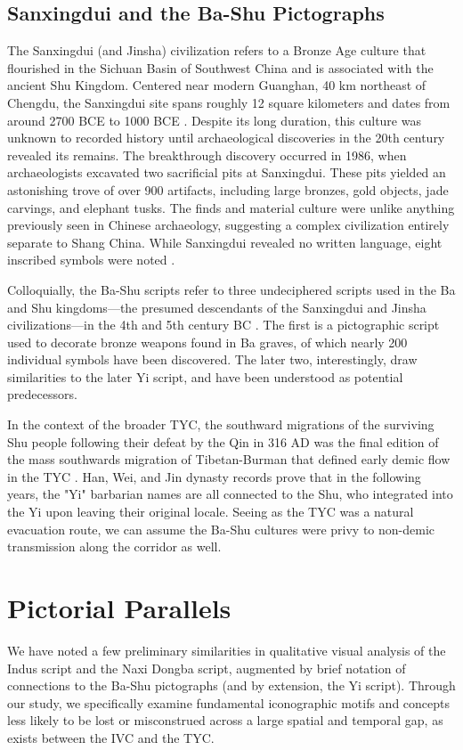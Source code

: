 \documentclass[11pt,a4paper,oneside]{report}
\begin{document}
\subsection{Sanxingdui and the Ba-Shu Pictographs}
\noindent\hspace{1cm}
The Sanxingdui (and Jinsha) civilization refers to a Bronze Age culture that flourished in the Sichuan Basin of Southwest China and is associated with the ancient Shu Kingdom. Centered near modern Guanghan, 40 km northeast of Chengdu, the Sanxingdui site spans roughly 12 square kilometers and dates from around 2700 BCE to 1000 BCE \cite{li_new_2023}. Despite its long duration, this culture was unknown to recorded history until archaeological discoveries in the 20th century revealed its remains. The breakthrough discovery occurred in 1986, when archaeologists excavated two sacrificial pits at Sanxingdui. These pits yielded an astonishing trove of over 900 artifacts, including large bronzes, gold objects, jade carvings, and elephant tusks. The finds and material culture were unlike anything previously seen in Chinese archaeology, suggesting a complex civilization entirely separate to Shang China. While Sanxingdui revealed no written language, eight inscribed symbols were noted \cite{sanxingdui_museum_sanxingdui_2023}.

Colloquially, the Ba-Shu scripts refer to three undeciphered scripts used in the Ba and Shu kingdoms—the presumed descendants of the Sanxingdui and Jinsha civilizations—in the 4th and 5th century BC \cite{sage_ancient_1992}. The first is a pictographic script used to decorate bronze weapons found in Ba graves, of which nearly 200 individual symbols have been discovered. The later two, interestingly, draw similarities to the later Yi script, and have been understood as potential predecessors.

In the context of the broader TYC, the southward migrations of the surviving Shu people following their defeat by the Qin in 316 AD was the final edition of the mass southwards migration of Tibetan-Burman that defined early demic flow in the TYC \cite{shi_south-western_2011}. Han, Wei, and Jin dynasty records prove that in the following years, the "Yi" barbarian names are all connected to the Shu, who integrated into the Yi upon leaving their original locale. Seeing as the TYC was a natural evacuation route, we can assume the Ba-Shu cultures were privy to non-demic transmission along the corridor as well.

\section{Pictorial Parallels}
\noindent\hspace{1cm}
We have noted a few preliminary similarities in qualitative visual analysis of the Indus script and the Naxi Dongba script, augmented by brief notation of connections to the Ba-Shu pictographs (and by extension, the Yi script). Through our study, we specifically examine fundamental iconographic motifs and concepts less likely to be lost or misconstrued across a large spatial and temporal gap, as exists between the IVC and the TYC.
\end{document}
